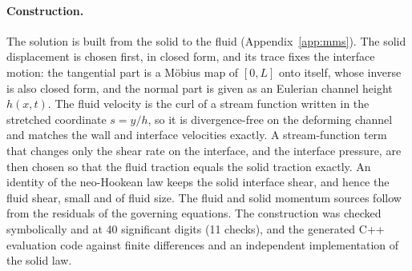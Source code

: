 \paragraph{Construction.}
The solution is built from the solid to the fluid (Appendix~\ref{app:mms}).
The solid displacement is chosen first, in closed form, and its trace fixes the interface motion: the tangential part is a M\"obius map of $[0,L]$ onto itself, whose inverse is also closed form, and the normal part is given as an Eulerian channel height $h(x,t)$.
The fluid velocity is the curl of a stream function written in the stretched coordinate $s = y/h$, so it is divergence-free on the deforming channel and matches the wall and interface velocities exactly.
A stream-function term that changes only the shear rate on the interface, and the interface pressure, are then chosen so that the fluid traction equals the solid traction exactly.
An identity of the neo-Hookean law keeps the solid interface shear, and hence the fluid shear, small and of fluid size.
The fluid and solid momentum sources follow from the residuals of the governing equations.
The construction was checked symbolically and at 40 significant digits (11 checks), and the generated C++ evaluation code against finite differences and an independent implementation of the solid law.

